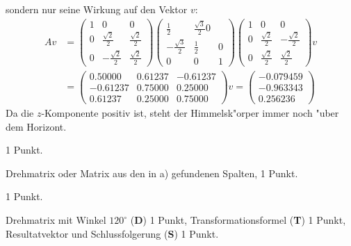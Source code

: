 \begin{loesung}
\begin{teilaufgaben}
sondern nur seine Wirkung auf den Vektor $v$:
\begin{align*}
Av&=
\begin{pmatrix}
1& 0                  & 0                 \\
0& \frac{\sqrt{2}}2   & \frac{\sqrt{2}}2  \\
0&-\frac{\sqrt{2}}2   & \frac{\sqrt{2}}2
\end{pmatrix}
\begin{pmatrix}
 \frac12          & \frac{\sqrt{3}}2 0\\
-\frac{\sqrt{3}}2 & \frac12        & 0\\
 0                & 0              & 1
\end{pmatrix}
\begin{pmatrix}
1& 0                 & 0                 \\
0& \frac{\sqrt{2}}2  &-\frac{\sqrt{2}}2  \\
0& \frac{\sqrt{2}}2  & \frac{\sqrt{2}}2  
\end{pmatrix}v
\\
&=
\begin{pmatrix}
   0.50000 & 0.61237& -0.61237\\
  -0.61237 & 0.75000&  0.25000\\
   0.61237 & 0.25000&  0.75000
\end{pmatrix}v
=\begin{pmatrix}
  -0.079459\\
  -0.963343\\
   0.256236
\end{pmatrix}
\end{align*}
Da die $z$-Komponente positiv ist, steht der Himmelsk"orper immer noch
"uber dem Horizont.
\end{teilaufgaben}
\end{loesung}

\begin{bewertung}
\begin{teilaufgaben}
\item 1 Punkt.
\item Drehmatrix oder Matrix aus den in a) gefundenen Spalten, 1 Punkt.
\item 1 Punkt.
\item Drehmatrix mit Winkel $120^\circ$ ({\bf D}) 1 Punkt,
Transformationsformel ({\bf T}) 1 Punkt,
Resultatvektor und Schlussfolgerung ({\bf S}) 1 Punkt.
\end{teilaufgaben}
\end{bewertung}

